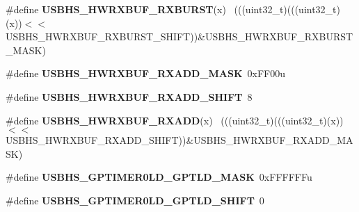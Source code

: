 \begin{DoxyCompactItemize}
\item 
\hypertarget{group___u_s_b_h_s___register___masks_ga1aa94b03466c7b76860b94b07cabd0e9}{}\#define {\bfseries U\+S\+B\+H\+S\+\_\+\+H\+W\+R\+X\+B\+U\+F\+\_\+\+R\+X\+B\+U\+R\+S\+T}(x)                              ~(((uint32\+\_\+t)(((uint32\+\_\+t)(x))$<$$<$U\+S\+B\+H\+S\+\_\+\+H\+W\+R\+X\+B\+U\+F\+\_\+\+R\+X\+B\+U\+R\+S\+T\+\_\+\+S\+H\+I\+F\+T))\&U\+S\+B\+H\+S\+\_\+\+H\+W\+R\+X\+B\+U\+F\+\_\+\+R\+X\+B\+U\+R\+S\+T\+\_\+\+M\+A\+S\+K)\label{group___u_s_b_h_s___register___masks_ga1aa94b03466c7b76860b94b07cabd0e9}

\item 
\hypertarget{group___u_s_b_h_s___register___masks_gac7931a6df9f14ba6b67c98c1b0f27313}{}\#define {\bfseries U\+S\+B\+H\+S\+\_\+\+H\+W\+R\+X\+B\+U\+F\+\_\+\+R\+X\+A\+D\+D\+\_\+\+M\+A\+S\+K}~0x\+F\+F00u\label{group___u_s_b_h_s___register___masks_gac7931a6df9f14ba6b67c98c1b0f27313}

\item 
\hypertarget{group___u_s_b_h_s___register___masks_ga8f7ecbfbc7837a08b41c180c686141f8}{}\#define {\bfseries U\+S\+B\+H\+S\+\_\+\+H\+W\+R\+X\+B\+U\+F\+\_\+\+R\+X\+A\+D\+D\+\_\+\+S\+H\+I\+F\+T}~8\label{group___u_s_b_h_s___register___masks_ga8f7ecbfbc7837a08b41c180c686141f8}

\item 
\hypertarget{group___u_s_b_h_s___register___masks_gaa39a1f1c4ac4e445365998b60e882e05}{}\#define {\bfseries U\+S\+B\+H\+S\+\_\+\+H\+W\+R\+X\+B\+U\+F\+\_\+\+R\+X\+A\+D\+D}(x)                                  ~(((uint32\+\_\+t)(((uint32\+\_\+t)(x))$<$$<$U\+S\+B\+H\+S\+\_\+\+H\+W\+R\+X\+B\+U\+F\+\_\+\+R\+X\+A\+D\+D\+\_\+\+S\+H\+I\+F\+T))\&U\+S\+B\+H\+S\+\_\+\+H\+W\+R\+X\+B\+U\+F\+\_\+\+R\+X\+A\+D\+D\+\_\+\+M\+A\+S\+K)\label{group___u_s_b_h_s___register___masks_gaa39a1f1c4ac4e445365998b60e882e05}

\item 
\hypertarget{group___u_s_b_h_s___register___masks_ga66dfe27ad448b002dc9264c63ae8dc22}{}\#define {\bfseries U\+S\+B\+H\+S\+\_\+\+G\+P\+T\+I\+M\+E\+R0\+L\+D\+\_\+\+G\+P\+T\+L\+D\+\_\+\+M\+A\+S\+K}~0x\+F\+F\+F\+F\+F\+Fu\label{group___u_s_b_h_s___register___masks_ga66dfe27ad448b002dc9264c63ae8dc22}

\item 
\hypertarget{group___u_s_b_h_s___register___masks_ga937a621d783c215021d6f6222a9f5593}{}\#define {\bfseries U\+S\+B\+H\+S\+\_\+\+G\+P\+T\+I\+M\+E\+R0\+L\+D\+\_\+\+G\+P\+T\+L\+D\+\_\+\+S\+H\+I\+F\+T}~0\label{group___u_s_b_h_s___register___masks_ga937a621d783c215021d6f6222a9f5593}


\end{DoxyCompactItemize}
